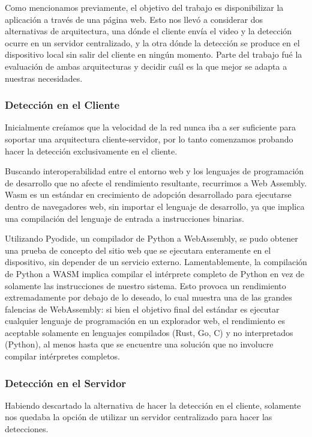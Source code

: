\documentclass[a4paper]{article}
\begin{document}
Como mencionamos previamente, el objetivo del trabajo es disponibilizar la aplicación a través de una página web. Esto nos llevó a considerar dos alternativas de arquitectura, una dónde el cliente envía el video y la detección ocurre en un servidor centralizado, y la otra dónde la detección se produce en el dispositivo local sin salir del cliente en ningún momento. Parte del trabajo fué la evaluación de ambas arquitecturas y decidir cuál es la que mejor se adapta a nuestras necesidades.

\subsubsection{Detección en el Cliente}

Inicialmente creíamos que la velocidad de la red nunca iba a ser suficiente para soportar una arquitectura cliente-servidor, por lo tanto comenzamos probando hacer la detección exclusivamente en el cliente.

Buscando interoperabilidad entre el entorno web y los lenguajes de programación de desarrollo que no afecte el rendimiento resultante, recurrimos a Web Assembly. Wasm es un estándar en crecimiento de adopción desarrollado para ejecutarse dentro de navegadores web, sin importar el lenguaje de desarrollo, ya que implica una compilación del lenguaje de entrada a instrucciones binarias.

Utilizando Pyodide, un compilador de Python a WebAssembly, se pudo obtener una prueba de concepto del sitio web que se ejecutara enteramente en el dispositivo, sin depender de un servicio externo. Lamentablemente, la compilación de Python a WASM implica compilar el intérprete completo de Python en vez de solamente las instrucciones de nuestro sistema. Esto provoca un rendimiento extremadamente por debajo de lo deseado, lo cual muestra una de las grandes falencias de WebAssembly: si bien el objetivo final del estándar es ejecutar cualquier lenguaje de programación en un explorador web, el rendimiento es aceptable solamente en lenguajes compilados (Rust, Go, C) y no interpretados (Python), al menos hasta que se encuentre una solución que no involucre compilar intérpretes completos.

\subsubsection{Detección en el Servidor}

Habiendo descartado la alternativa de hacer la detección en el cliente, solamente nos quedaba la opción de utilizar un servidor centralizado para hacer las detecciones.
\end{document}
